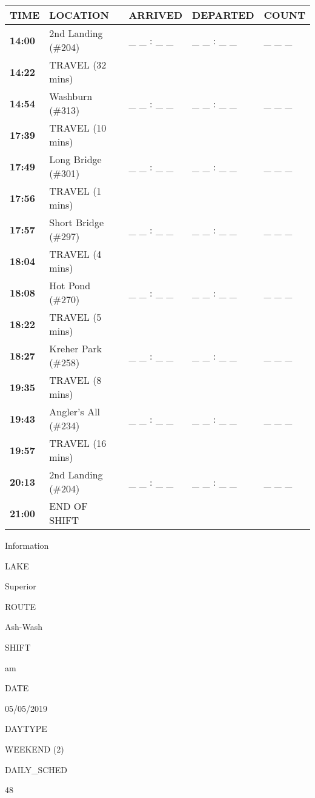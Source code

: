 \documentclass[]{article}
\begin{document}
\begin{tabular}{>{\bfseries}lllll}
\toprule
\textbf{TIME} & \textbf{LOCATION} & \textbf{ARRIVED} & \textbf{DEPARTED} & \textbf{COUNT}\\
\midrule
14:00 & 2nd Landing (\#204) & \_ \_ : \_ \_ & \_ \_ : \_ \_ & \_ \_ \_\\
14:22 & TRAVEL (32 mins) &  &  & \\
14:54 & Washburn (\#313) & \_ \_ : \_ \_ & \_ \_ : \_ \_ & \_ \_ \_\\
17:39 & TRAVEL (10 mins) &  &  & \\
17:49 & Long Bridge (\#301) & \_ \_ : \_ \_ & \_ \_ : \_ \_ & \_ \_ \_\\
17:56 & TRAVEL (1 mins) &  &  & \\
17:57 & Short Bridge (\#297) & \_ \_ : \_ \_ & \_ \_ : \_ \_ & \_ \_ \_\\
18:04 & TRAVEL (4 mins) &  &  & \\
18:08 & Hot Pond (\#270) & \_ \_ : \_ \_ & \_ \_ : \_ \_ & \_ \_ \_\\
18:22 & TRAVEL (5 mins) &  &  & \\
18:27 & Kreher Park (\#258) & \_ \_ : \_ \_ & \_ \_ : \_ \_ & \_ \_ \_\\
19:35 & TRAVEL (8 mins) &  &  & \\
19:43 & Angler's All (\#234) & \_ \_ : \_ \_ & \_ \_ : \_ \_ & \_ \_ \_\\
19:57 & TRAVEL (16 mins) &  &  & \\
20:13 & 2nd Landing (\#204) & \_ \_ : \_ \_ & \_ \_ : \_ \_ & \_ \_ \_\\
21:00 & END OF SHIFT &  &  & \\
\bottomrule
\end{tabular}\newpage

Information

LAKE

Superior

ROUTE

Ash-Wash

SHIFT

am

DATE

05/05/2019

DAYTYPE

WEEKEND (2)

DAILY\_SCHED

48

\vspace{24pt}
\end{document}
